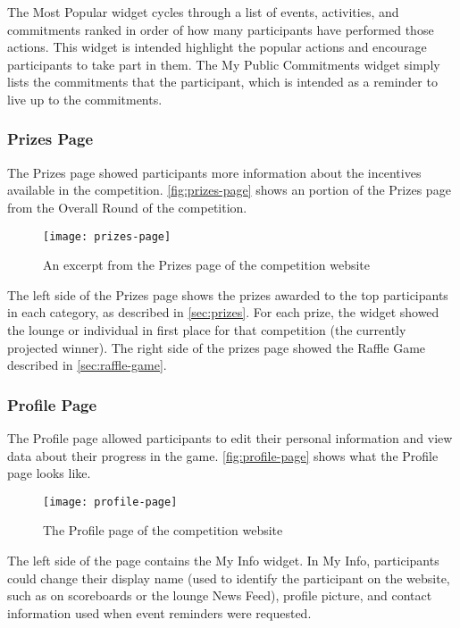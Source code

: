 The Most Popular widget cycles through a list of events, activities, and commitments ranked in order of how many participants have performed those actions. This widget is intended highlight the popular actions and encourage participants to take part in them. The My Public Commitments widget simply lists the commitments that the participant, which is intended as a reminder to live up to the commitments.


\subsubsection{Prizes Page}

The Prizes page showed participants more information about the incentives available in the competition. \autoref{fig:prizes-page} shows an portion of the Prizes page from the Overall Round of the competition.

\begin{figure}[htbp]
	\centering
		\texttt{[image: prizes-page]}
		\caption{An excerpt from the Prizes page of the competition website}
\label{fig:prizes-page}
\end{figure}

The left side of the Prizes page shows the prizes awarded to the top participants in each category, as described in \autoref{sec:prizes}. For each prize, the widget showed the lounge or individual in first place for that competition (the currently projected winner). The right side of the prizes page showed the Raffle Game described in \autoref{sec:raffle-game}.


\subsubsection{Profile Page}

The Profile page allowed participants to edit their personal information and view data about their progress in the game. \autoref{fig:profile-page} shows what the Profile page looks like.

\begin{figure}[htbp]
	\centering
		\texttt{[image: profile-page]}
		\caption{The Profile page of the competition website}
\label{fig:profile-page}
\end{figure}

The left side of the page contains the My Info widget. In My Info, participants could change their display name (used to identify the participant on the website, such as on scoreboards or the lounge News Feed), profile picture, and contact information used when event reminders were requested.

